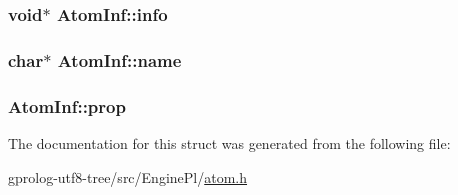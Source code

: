 \subsubsection[{\texorpdfstring{info}{info}}]{\setlength{\rightskip}{0pt plus 5cm}void$\ast$ Atom\+Inf\+::info}\hypertarget{structAtomInf_a497dcae4cea5b3a779731b97476d05a5}{}\label{structAtomInf_a497dcae4cea5b3a779731b97476d05a5}
\subsubsection[{\texorpdfstring{name}{name}}]{\setlength{\rightskip}{0pt plus 5cm}char$\ast$ Atom\+Inf\+::name}\hypertarget{structAtomInf_a2e8fbcd0d525d43b562f771d099e694e}{}\label{structAtomInf_a2e8fbcd0d525d43b562f771d099e694e}
\subsubsection[{\texorpdfstring{prop}{prop}}]{ Atom\+Inf\+::prop}\hypertarget{structAtomInf_a649620e4716f966372c391e2e8e5245d}{}\label{structAtomInf_a649620e4716f966372c391e2e8e5245d}


The documentation for this struct was generated from the following file\+:\begin{DoxyCompactItemize}
\item 
gprolog-\/utf8-\/tree/src/\+Engine\+Pl/\hyperlink{atom_8h}{atom.\+h}\end{DoxyCompactItemize}
